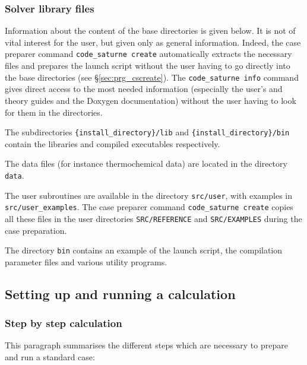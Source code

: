 {{{{{%
\subsubsection{\CS Solver library files}
\label{sec:prg_library}%
Information about the content of the \CS base directories is given below. It
is not of vital interest for the user, but given only as general
information. Indeed, the case preparer command \texttt{code\_saturne~create}
automatically extracts the necessary files and prepares the launch script
without the user having to go directly into the \CS base directories
(see \S\ref{sec:prg_cscreate}).
The \texttt{code\_saturne~info} command gives direct
access to the most needed information (especially the user's and theory
guides and the Doxygen documentation) without the user having to look for them in the \CS
directories.

The subdirectories \texttt{\{install\_directory\}/lib} and \texttt{\{install\_directory\}/bin }
contain the libraries and compiled executables respectively.

The data files (for instance thermochemical data) are located in the
directory \texttt{data}.

The user subroutines are available in the directory \texttt{src/user},
with examples in \texttt{src/user\_examples}.
The case preparer command \texttt{code\_saturne~create} copies all these files
in the user directories \texttt{SRC/REFERENCE} and \texttt{SRC/EXAMPLES}
during the case preparation.

The directory \texttt{bin} contains an example of the launch script, the
compilation parameter files and various utility programs.

\subsection{Setting up and running a calculation}

\subsubsection{Step by step calculation}
\label{sec:prg_stepbystepcalculation}%

This paragraph summarises the different steps which are necessary to
prepare and run a standard case:

}}}}}
